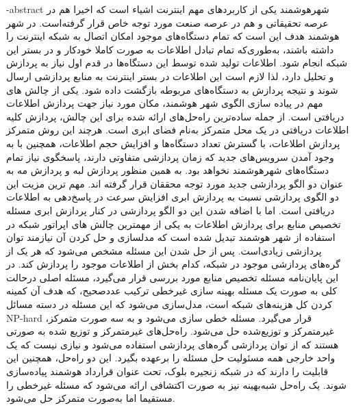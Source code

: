 \fa-abstract{
	شهرهوشمند یکی از کاربردهای مهم اینترنت اشیاء است که اخیرا هم در عرصه تحقیقاتی و هم در عرصه صنعت مورد توجه خاص قرار گرفته‌است. در شهر هوشمند هدف این است که تمام دستگاه‌های موجود امکان اتصال به شبکه اینترنت را داشته باشند، به‌طوری‌که تمام تبادل اطلاعات به صورت کاملا خودکار و در بستر این شبکه انجام شود. 
	اطلاعات تولید شده توسط این دستگاه‌ها در قدم اول نیاز به پردازش و تحلیل دارد، لذا لازم است این اطلاعات در بستر اینترنت به منابع پردازشی ارسال شوند و نتیجه پردازش به دستگاه‌های مربوطه بازگشت داده شود. 
	یکی از چالش های مهم در پیاده سازی الگوی شهر هوشمند، مکان مورد نیاز جهت پردازش اطلاعات دریافتی است. از جمله ساده‌ترین راه‌حل‌های ارائه شده برای این چالش، پردازش کلیه‌ اطلاعات دریافتی در یک محل متمرکز به‌نام فضای ابری است. هرچند این روش متمرکز پردازش اطلاعات، با گسترش تعداد دستگاه‌ها و افزایش حجم اطلاعات، همچنین با به وجود آمدن سرویس‌های جدید که زمان پردازشی متفاوتی دارند، پاسخگوی نیاز تمام دستگاه‌های شهرهوشمند نخواهد بود.
	به همین منظور پردازش لبه و پردازش مه به عنوان دو الگو پردازشی جدید مورد توجه محققان قرار گرفته اند. مهم ترین مزیت این دو الگوی پردازشی نسبت به پردازش ابری افزایش سرعت در پاسخ‌دهی به اطلاعات دریافتی است. اما با اضافه شدن این دو الگو پردازشی در کنار پردازش ابری مسئله تخصیص منابع برای پردازش اطلاعات به یکی از مهمترین چالش های اپراتور شبکه در استفاده از شهر هوشمند تبدیل شده است که مدلسازی و حل کردن آن نیازمند توان پردازشی زیادی‌است. پس از حل شدن این مسئله مشخص می‌شود که هر یک از گره‌های پردازشی موجود در شبکه، کدام بخش از اطلاعات موجود را پردازش کند. 
	در این پایان‌نامه مسئله تخصیص منابع مورد بررسی قرار می‌گیرد، مسئله اصلی درحالت کلی به صورت یک مسئله بهینه سازی غیرخطی ترکیب عددصحیح، که هدف آن کمینه کردن کل هزینه‌های شبکه است، مدل‌سازی می‌شود که این مسئله در دسته مسائل NP-hard قرار می‌گیرد. 
	مسئله خطی سازی می‌شود و به سه صورت متمرکز، غیرمتمرکز و توزیع‌شده حل می‌شود. راه‌حل‌های غیرمتمرکز و توزیع شده به صورتی هستند که از توان پردازشی گره‌های پردازشی استفاده می‌شود و نیازی نیست که یک واحد خارجی همه مسئولیت حل مسئله را برعهده بگیرد. این دو راه‌حل، همچنین این قابلیت را دارند که در شبکه زنجیره‌ بلوک، تحت عنوان قرارداد هوشمند پیاده‌سازی شوند.
	یک راه‌حل شبه‌بهینه نیز به صورت اکتشافی ارائه می‌شود که مسئله غیرخطی را مستقیما اما به‌صورت متمرکز حل می‌شود. 
}

\cleartorightpage
\abstractPage

\cleartorightpage
